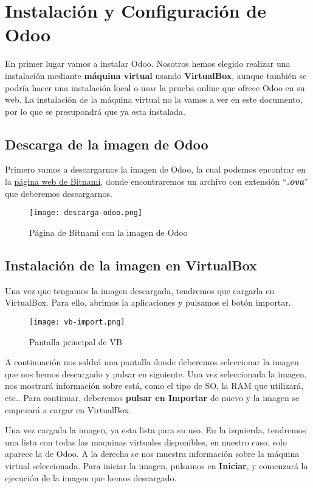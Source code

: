 \section{Instalación y Configuración de  Odoo}
En primer lugar vamos a instalar Odoo. Nosotros hemos elegido realizar una instalación mediante \textbf{máquina virtual} usando \textbf{VirtualBox}, aunque también se podría hacer una instalación local o usar la prueba online que ofrece Odoo en su web. La instalación de la máquina virtual no la vamos a ver en este documento, por lo que se presupondrá que ya esta instalada.

\subsection{Descarga de la imagen de Odoo}
Primero vamos a descargarnos la imagen de Odoo, la cual podemos encontrar en la \href{https://bitnami.com/stack/odoo/virtual-machine}{página web de Bitnami}, donde encontraremos un archivo con extensión ``\textbf{\textit{.ova}}'' que deberemos descargarnos.

\begin{figure}[h]
    \centering
    \texttt{[image: descarga-odoo.png]}
    \caption{Página de Bitnami con la imagen de Odoo}
\end{figure}


\subsection{Instalación de la imagen en VirtualBox}
Una vez que tengamos la imagen descargada, tendremos que cargarla en VirtualBox. Para ello, abrimos la aplicaciones y pulsamos el botón importar.

\begin{figure}[h]
    \centering
    \texttt{[image: vb-import.png]}
    \caption{Pantalla principal de VB}
\end{figure}

A continuación nos saldrá una pantalla donde deberemos seleccionar la imagen que nos hemos descargado y pulsar en siguiente. Una vez seleccionada la imagen, nos mostrará información sobre está, como el tipo de SO, la RAM que utilizará, etc.. Para continuar, deberemos \textbf{pulsar en Importar} de nuevo y la imagen se empezará a cargar en VirtualBox.

Una vez cargada la imagen, ya esta lista para su uso. En la izquierda, tendremos una lista con todas las maquinas virtuales disponibles, en nuestro caso, solo aparece la de Odoo. A la derecha se nos muestra información sobre la máquina virtual seleccionada. Para iniciar la imagen, pulsamos en \textbf{Iniciar}, y comenzará la ejecución de la imagen que hemos descargado.

